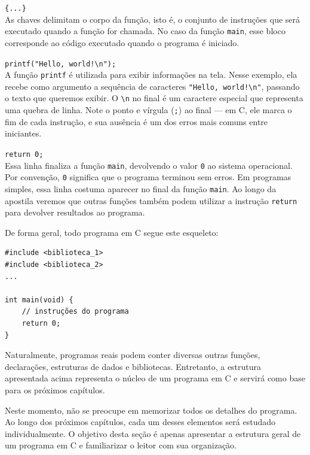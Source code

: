 \documentclass[12pt,a4paper,oneside]{extreport}
\begin{document}
\texttt{\{...\}} \\
As chaves delimitam o corpo da função, isto é, o conjunto de instruções que será executado quando a função for chamada. No caso da função \texttt{main}, esse bloco corresponde ao código executado quando o programa é iniciado.

\texttt{printf("Hello, world!\textbackslash n");} \\
A função \texttt{printf} é utilizada para exibir informações na tela. Nesse exemplo, ela recebe como argumento a sequência de caracteres \texttt{"Hello, world!\textbackslash n"}, passando o texto que queremos exibir. O \texttt{\textbackslash n} no final é um caractere especial que representa uma quebra de linha. Note o ponto e vírgula (\texttt{;}) ao final — em C, ele marca o fim de cada instrução, e sua ausência é um dos erros mais comuns entre iniciantes.

\texttt{return 0;} \\
Essa linha finaliza a função \texttt{main}, devolvendo o valor \texttt{0} ao sistema operacional. Por convenção, \texttt{0} significa que o programa terminou sem erros. Em programas simples, essa linha costuma aparecer no final da função \texttt{main}. Ao longo da apostila veremos que outras funções também podem utilizar a instrução \texttt{return} para devolver resultados ao programa.

De forma geral, todo programa em C segue este esqueleto:

\begin{lstlisting}
#include <biblioteca_1>
#include <biblioteca_2>
...

int main(void) {
    // instruções do programa
    return 0;
}
\end{lstlisting}

Naturalmente, programas reais podem conter diversas outras funções, declarações, estruturas de dados e bibliotecas. Entretanto, a estrutura apresentada acima representa o núcleo de um programa em C e servirá como base para os próximos capítulos.

\begin{observacao}

Neste momento, não se preocupe em memorizar todos os detalhes do programa.
Ao longo dos próximos capítulos, cada um desses elementos será estudado
individualmente. O objetivo desta seção é apenas apresentar a estrutura geral
de um programa em C e familiarizar o leitor com sua organização.

\end{observacao}
\end{document}
